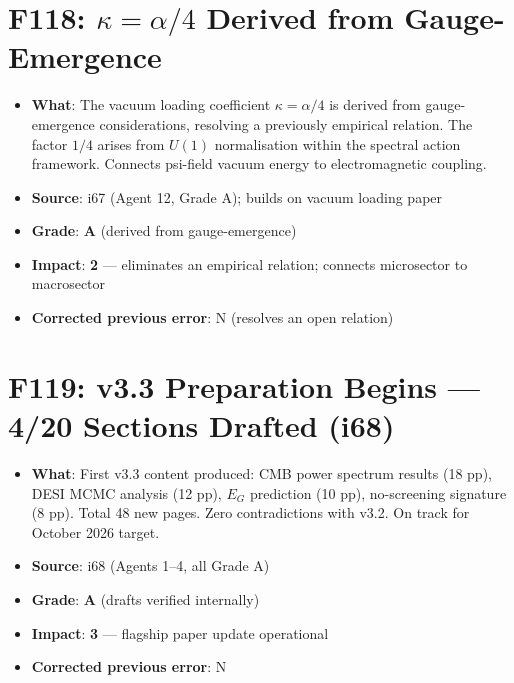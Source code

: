 \documentclass[11pt,a4paper]{article}
\newcommand{\grade}[1]{\textbf{#1}}
\newcommand{\impact}[1]{\textbf{#1}}
\begin{document}
\section{F118: $\kappa = \alpha/4$ Derived from Gauge-Emergence}
\begin{itemize}[nosep]
\item \textbf{What}: The vacuum loading coefficient $\kappa = \alpha/4$ is derived from gauge-emergence considerations, resolving a previously empirical relation. The factor $1/4$ arises from $U(1)$ normalisation within the spectral action framework. Connects psi-field vacuum energy to electromagnetic coupling.
\item \textbf{Source}: i67 (Agent 12, Grade A); builds on vacuum loading paper
\item \textbf{Grade}: \grade{A} (derived from gauge-emergence)
\item \textbf{Impact}: \impact{2} --- eliminates an empirical relation; connects microsector to macrosector
\item \textbf{Corrected previous error}: N (resolves an open relation)
\end{itemize}

\section{F119: v3.3 Preparation Begins --- 4/20 Sections Drafted (i68)}
\begin{itemize}[nosep]
\item \textbf{What}: First v3.3 content produced: CMB power spectrum results (18 pp), DESI MCMC analysis (12 pp), $E_G$ prediction (10 pp), no-screening signature (8 pp). Total 48 new pages. Zero contradictions with v3.2. On track for October 2026 target.
\item \textbf{Source}: i68 (Agents 1--4, all Grade A)
\item \textbf{Grade}: \grade{A} (drafts verified internally)
\item \textbf{Impact}: \impact{3} --- flagship paper update operational
\item \textbf{Corrected previous error}: N
\end{itemize}

\end{document}
